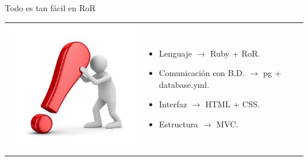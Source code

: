 \begin{frame}{Todo es tan fácil en RoR}
  \begin{tabular}{c l}
    \raisebox{-0.5\totalheight}
             {\includegraphics[scale=0.3]{img/ed_building_ror}} &

    \pause

    \parbox{0.5\textwidth}{
      \begin{itemize}
        \item Lenguaje $\rightarrow$ Ruby + RoR. \pause
        \item Comunicación con B.D. $\rightarrow$ pg + database.yml. \pause
        \item Interfaz $\rightarrow$ HTML + CSS. \pause
        \item Estructura $\rightarrow$ MVC.
      \end{itemize}
    } \\
  \end{tabular}
\end{frame}
